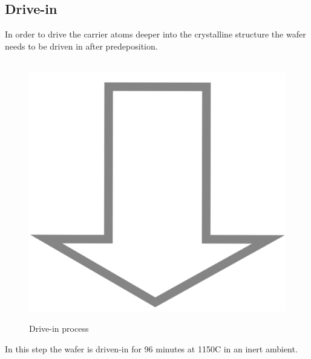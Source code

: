 \subsection{Drive-in}
In order to drive the carrier atoms deeper into the crystalline structure the wafer needs to be driven in after predeposition.
\begin{figure}[H]
	\centering
	\begin{tikzpicture}[node distance = 3cm, auto, thick,scale=\CrossSectionOnly, every node/.style={transform shape}]
		
	\end{tikzpicture} \\
	\includegraphics[scale=0.01]{down_arrow.png} \\
	\begin{tikzpicture}[node distance = 3cm, auto, thick,scale=\CrossSectionOnly, every node/.style={transform shape}]
		
	\end{tikzpicture}
	\caption{Drive-in process}
\end{figure}
In this step the wafer is  driven-in for 96 minutes at 1150\degree C in an inert ambient.

